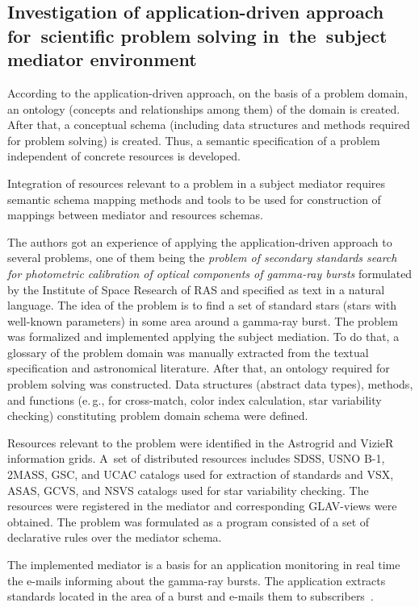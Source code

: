 \begin{multicols}{2}
\subsection{Investigation of application-driven approach for~scientific problem 
solving in~the~subject mediator environment}

\noindent
According to the application-driven approach, on the basis of a problem domain, an ontology 
(concepts and relationships among them) of the domain is created. After that, a conceptual schema 
(including data structures and methods required for problem solving) is created. Thus, a semantic 
specification of a problem independent of concrete resources is developed. 

Integration of resources relevant to a problem in a subject mediator requires semantic schema 
mapping methods and tools to be used for construction of mappings between mediator and 
resources schemas.

The authors got an experience of applying the application-driven approach to several problems, one of them 
being the \textit{problem of secondary standards search for photometric calibration of optical 
components of gamma-ray bursts} formulated by the Institute of Space Research of RAS and 
specified as text in a natural language. The idea of the problem is to find a set of standard stars 
(stars with well-known parameters) in some area around a gamma-ray burst. The problem was 
formalized and implemented applying the subject mediation. To do that, a glossary of the problem 
domain was manually extracted from the textual specification and astronomical literature. After 
that, an ontology required for problem solving was constructed. Data structures (abstract data 
types), methods, and functions (e.\,g., for cross-match, color index calculation, star variability 
checking) constituting problem domain schema were defined.

Resources relevant to the problem were identified in the Astrogrid and VizieR information grids. 
A~set of distributed resources includes SDSS, USNO B-1, 2MASS, GSC, and UCAC catalogs used for 
extraction of standards and VSX, ASAS, GCVS, and NSVS catalogs used for star variability checking. The 
resources were registered in the mediator and corresponding GLAV-views were obtained. The 
problem was formulated as a program consisted of a set of declarative rules over the mediator 
schema. 

The implemented mediator is a basis for an application monitoring in real time the e-mails 
informing about the gamma-ray bursts. The application extracts standards located in the area of a 
burst and e-mails them to subscribers~\cite{6kal}.


\end{multicols}
